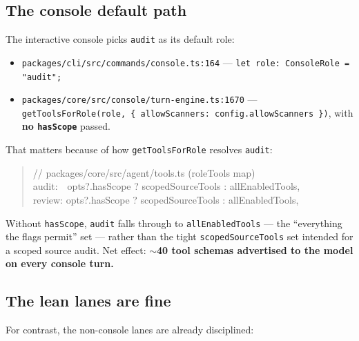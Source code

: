 \documentclass[11pt]{article}
\begin{document}
\subsection{The console default path}

The interactive console picks \texttt{audit} as its default role:

\begin{itemize}[leftmargin=*]
  \item \texttt{packages/cli/src/commands/console.ts:164} ---
  \texttt{let role: ConsoleRole = "audit";}
  \item \texttt{packages/core/src/console/turn-engine.ts:1670} ---
  \texttt{getToolsForRole(role, \{ allowScanners: config.allowScanners \})},
  with \textbf{no \texttt{hasScope}} passed.
\end{itemize}

That matters because of how \texttt{getToolsForRole} resolves \texttt{audit}:

\begin{quote}
\ttfamily
// packages/core/src/agent/tools.ts (roleTools map)\\
audit:\ \ opts?.hasScope ? scopedSourceTools : allEnabledTools,\\
review: opts?.hasScope ? scopedSourceTools : allEnabledTools,
\end{quote}

Without \texttt{hasScope}, \texttt{audit} falls through to
\texttt{allEnabledTools} --- the ``everything the flags permit'' set --- rather
than the tight \texttt{scopedSourceTools} set intended for a scoped source audit.
Net effect: \textbf{$\sim$40 tool schemas advertised to the model on every
console turn.}

\subsection{The lean lanes are fine}

For contrast, the non-console lanes are already disciplined:
\end{document}
